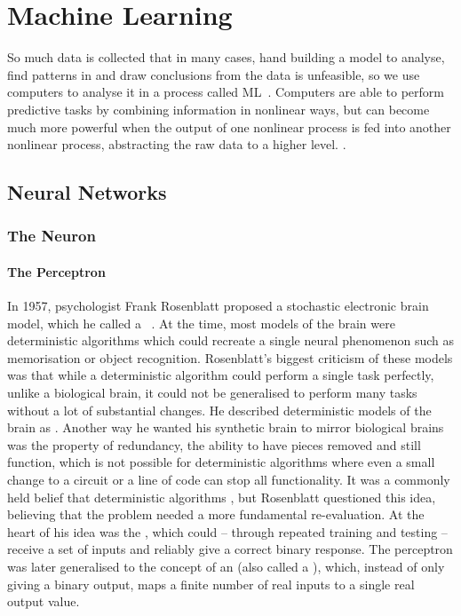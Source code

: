
\chapter{Machine Learning}

So much data is collected that in many cases, hand building a model to analyse, find patterns in and draw conclusions from the data is unfeasible, so we use computers to analyse it in a process called \ac{ML}~\autocite[1]{murphy2012}.
Computers are able to perform predictive tasks by combining information in nonlinear ways, but can become much more powerful when the output of one nonlinear process is fed into another nonlinear process, abstracting the raw data to a higher level.
.

\section{Neural Networks}

\subsection{The Neuron}
\subsubsection{The Perceptron}
In 1957, psychologist Frank Rosenblatt proposed a stochastic electronic brain model, which he called a ~\autocite{rosenblatt1957}.
At the time, most models of the brain were deterministic algorithms which could recreate a single neural phenomenon such as memorisation or object recognition.
Rosenblatt's biggest criticism of these models was that while a deterministic algorithm could perform a single task perfectly, unlike a biological brain, it could not be generalised to perform many tasks without a lot of substantial changes.
He described deterministic models of the brain as .
Another way he wanted his synthetic brain to mirror biological brains was the property of redundancy, the ability to have pieces removed and still function, which is not possible for deterministic algorithms where even a small change to a circuit or a line of code can stop all functionality.
It was a commonly held belief that deterministic algorithms , but Rosenblatt questioned this idea, believing that the problem needed a more fundamental re-evaluation.
At the heart of his idea was the , which could -- through repeated training and testing -- receive a set of inputs and reliably give a correct binary response.
The perceptron was later generalised to the concept of an  (also called a ), which, instead of only giving a binary output, maps a finite number of real inputs to a single real output value.

